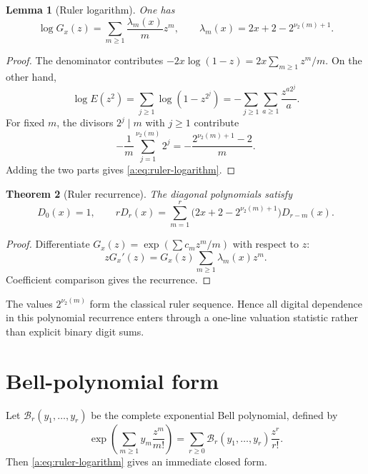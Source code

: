 \documentclass[11pt,a4paper,oneside,openany]{book}
\numberwithin{equation}{chapter}
\newtheorem{theorem}{Theorem}[chapter]
\newtheorem{lemma}[theorem]{Lemma}
\theoremstyle{definition}
\theoremstyle{remark}
\newcommand{\nuTwo}{\nu_2}
\newcommand{\Diag}{D}
\newcommand{\Bell}{\mathcal B}
\begin{document}
\begin{lemma}[Ruler logarithm]
One has
\begin{equation}
 \boxed{
 \log G_x(z)=\sum_{m\ge1}
 \frac{\lambda_m(x)}{m}z^m,
 \qquad
 \lambda_m(x)=2x+2-2^{\nuTwo(m)+1}.}
 \label{a:eq:ruler-logarithm}
\end{equation}
\end{lemma}

\begin{proof}
The denominator contributes
\(-2x\log(1-z)=2x\sum_{m\ge1}z^m/m\).  On the other hand,
\[
 \log E(z^2)
 =\sum_{j\ge1}\log(1-z^{2^j})
 =-\sum_{j\ge1}\sum_{a\ge1}\frac{z^{a2^j}}a.
\]
For fixed \(m\), the divisors \(2^j\mid m\) with \(j\ge1\) contribute
\[
 -\frac1m\sum_{j=1}^{\nuTwo(m)}2^j
 =-\frac{2^{\nuTwo(m)+1}-2}{m}.
\]
Adding the two parts gives \eqref{a:eq:ruler-logarithm}.
\end{proof}

\begin{theorem}[Ruler recurrence]
The diagonal polynomials satisfy
\begin{equation}
 \boxed{
 \Diag_0(x)=1,
 \qquad
 r\Diag_r(x)=\sum_{m=1}^{r}
 \bigl(2x+2-2^{\nuTwo(m)+1}\bigr)\Diag_{r-m}(x).}
 \label{a:eq:ruler-recurrence}
\end{equation}
\end{theorem}

\begin{proof}
Differentiate \(G_x(z)=\exp(\sum c_mz^m/m)\) with respect to \(z\):
\[
 zG_x'(z)=G_x(z)\sum_{m\ge1}\lambda_m(x)z^m.
\]
Coefficient comparison gives the recurrence.
\end{proof}

The values \(2^{\nuTwo(m)}\) form the classical ruler sequence.  Hence all
digital dependence in this polynomial recurrence enters through a one-line
valuation statistic rather than explicit binary digit sums.

\section{Bell-polynomial form}

Let \(\Bell_r(y_1,\ldots,y_r)\) be the complete exponential Bell polynomial,
defined by
\begin{equation}
 \exp\left(\sum_{m\ge1}y_m\frac{z^m}{m!}\right)
 =\sum_{r\ge0}\Bell_r(y_1,\ldots,y_r)\frac{z^r}{r!}.
 \label{a:eq:Bell-definition}
\end{equation}
Then \eqref{a:eq:ruler-logarithm} gives an immediate closed form.
\end{document}
